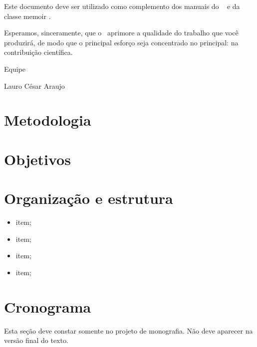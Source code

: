 Este documento deve ser utilizado como complemento dos manuais do \abnTeX\ 
\cite{abntex2classe,abntex2cite,abntex2cite-alf} e da classe \textsf{memoir}
\cite{memoir}. 

Esperamos, sinceramente, que o \abnTeX\ aprimore a qualidade do trabalho que
você produzirá, de modo que o principal esforço seja concentrado no principal:
na contribuição científica.

Equipe \abnTeX 

Lauro César Araujo
%
\section{Metodologia}

\lipsum[1]

\section{Objetivos}

\lipsum[7]

\lipsum[8]

\section{Organiza{\c c}{\~a}o e estrutura}

\lipsum*[9-11]

\begin{itemize}
\item item;
\item item;
\item item;
\item item;
\end{itemize}

\section{Cronograma}

Esta seção deve constar somente no projeto de monografia. Não deve aparecer na versão final do texto.



